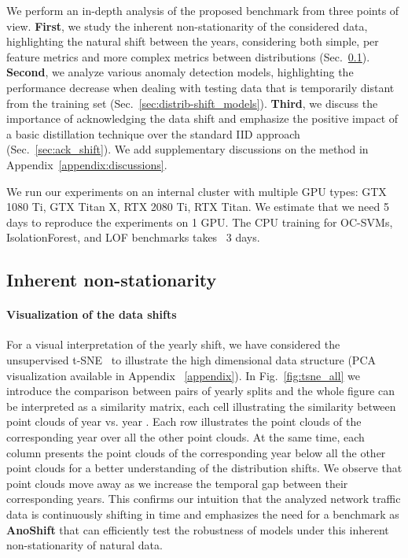 \documentclass{article}
\begin{document}
    We perform an in-depth analysis of the proposed benchmark from three points of view. \textbf{First}, we study the inherent non-stationarity of the considered data, highlighting the natural shift between the years, considering both simple, per feature metrics and more complex metrics between distributions (Sec.~\ref{sec:distrib-shift_metrics}). \textbf{Second}, we analyze various anomaly detection models, highlighting the performance decrease when dealing with testing data that is temporarily distant from the training set (Sec.~\ref{sec:distrib-shift_models}). \textbf{Third}, we discuss the importance of acknowledging the data shift and emphasize the positive impact of a basic distillation technique over the standard IID approach (Sec.~\ref{sec:ack_shift}). We add supplementary discussions on the method in Appendix~\ref{appendix:discussions}.
    
    We run our experiments on an internal cluster with multiple GPU types: GTX 1080 Ti, GTX Titan X, RTX 2080 Ti, RTX Titan. We estimate that we need 5 days to reproduce the experiments on 1 GPU. The CPU training for OC-SVMs, IsolationForest, and LOF benchmarks takes ~3 days.
    
\subsection{Inherent non-stationarity}\label{sec:distrib-shift_metrics}
    

    \paragraph{Visualization of the data shifts} For a visual interpretation of the yearly shift, we have considered the unsupervised t-SNE~\cite{tsne} to illustrate the high dimensional data structure (PCA visualization available in Appendix ~\ref{appendix}). In Fig.~\ref{fig:tsne_all} we introduce the comparison between pairs of yearly splits and the whole figure can be interpreted as a similarity matrix, each cell  illustrating the similarity between point clouds of year  vs. year . Each row illustrates the point clouds of the corresponding year over all the other point clouds. At the same time, each column presents the point clouds of the corresponding year below all the other point clouds for a better understanding of the distribution shifts.  We observe that point clouds move away as we increase the temporal gap between their corresponding years. This confirms our intuition that the analyzed network traffic data is continuously shifting in time and emphasizes the need for a benchmark as \textbf{AnoShift} that can efficiently test the robustness of models under this inherent non-stationarity of natural data. 
    
\end{document}
